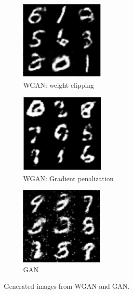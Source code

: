 \documentclass[a4paper,10pt]{article}
\begin{document}
\begin{figure}[ht]
	\begin{subfigure}{0.32\textwidth}
		\centering
		\includegraphics[width=0.5\linewidth]{WGAN2.png}
		\caption{WGAN: weight clipping}
		\label{fig:WGAN2}
	\end{subfigure}	 	
	\begin{subfigure}{0.32\textwidth}
		\centering
		\includegraphics[width=0.5\linewidth]{WGAN1.png}
		\caption{WGAN: Gradient penalization}
		\label{fig:WGAN1}
	\end{subfigure}	
	\begin{subfigure}{0.32\textwidth}
		\centering
		\includegraphics[width=0.5\linewidth]{GAN.png}
		\caption{GAN}
		\label{fig:GAN}
	\end{subfigure}
	\caption{Generated images from WGAN and GAN.}
	\label{fig:compareDBM}
\end{figure}
\end{document}
